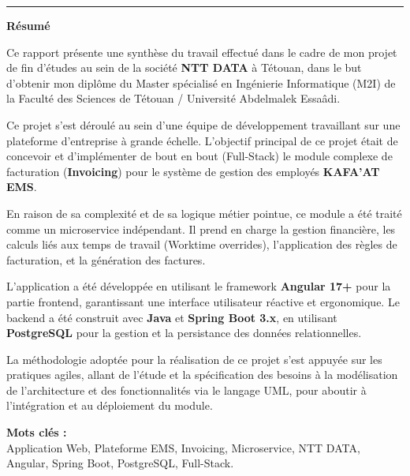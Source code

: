 \documentclass[12pt, a4paper, openany]{report}
\begin{document}
\vspace{0.6cm}

\vspace{0.1cm}


\newpage
\thispagestyle{frontmatter} 
{} 

\vspace*{0.5cm} 


\noindent
\textcolor{royalBlue}{\rule{0.65\textwidth}{1pt}}
\hfill
{\fontsize{24}{28}\selectfont\color{royalBlue}\bfseries Résumé}

\vspace{0.0cm}


\begin{large}
\setlength{\parskip}{0.3cm} 
\renewcommand{\baselinestretch}{1.3}\selectfont 

Ce rapport présente une synthèse du travail effectué dans le cadre de mon projet de fin d'études au sein de la société \textbf{NTT DATA} à Tétouan, dans le but d'obtenir mon diplôme du Master spécialisé en Ingénierie Informatique (M2I) de la Faculté des Sciences de Tétouan / Université Abdelmalek Essaâdi.

Ce projet s'est déroulé au sein d'une équipe de développement travaillant sur une plateforme d'entreprise à grande échelle. L'objectif principal de ce projet était de concevoir et d'implémenter de bout en bout (Full-Stack) le module complexe de facturation (\textbf{Invoicing}) pour le système de gestion des employés \textbf{KAFA'AT EMS}.

En raison de sa complexité et de sa logique métier pointue, ce module a été traité comme un microservice indépendant. Il prend en charge la gestion financière, les calculs liés aux temps de travail (Worktime overrides), l'application des règles de facturation, et la génération des factures.

L'application a été développée en utilisant le framework \textbf{Angular 17+} pour la partie frontend, garantissant une interface utilisateur réactive et ergonomique. Le backend a été construit avec \textbf{Java} et \textbf{Spring Boot 3.x}, en utilisant \textbf{PostgreSQL} pour la gestion et la persistance des données relationnelles.

La méthodologie adoptée pour la réalisation de ce projet s'est appuyée sur les pratiques agiles, allant de l'étude et la spécification des besoins à la modélisation de l'architecture et des fonctionnalités via le langage UML, pour aboutir à l'intégration et au déploiement du module.

\vspace{0cm}

\noindent\textbf{Mots clés :} \\
Application Web, Plateforme EMS, Invoicing, Microservice, NTT DATA, Angular, Spring Boot, PostgreSQL, Full-Stack.

\end{large}
\end{document}
